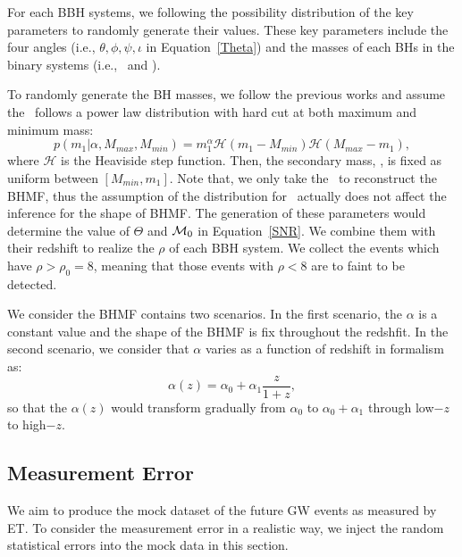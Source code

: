 \documentclass[twocolumn]{aastex62}
\begin{document}
For each BBH systems, we following the possibility distribution of the key parameters to randomly generate their values. These key parameters include the four angles (i.e., $\theta, \phi, \psi, \iota$ in Equation~\ref{Theta}) and the masses of each BHs in the binary systems (i.e., \mone\ and \mtwo).

To randomly generate the BH masses, we follow the previous works \citep{Kovetz2017PhRvD, Abbott2018b, Fishbach2018} and assume the \mone\ follows a power law distribution with hard cut at both maximum and minimum mass:
 \begin{equation} \label{equ_powlaw}
p(m_1|\alpha, M_{max}, M_{min}) = m_1^{\alpha} \mathcal{H}(m_1-M_{min}) \mathcal{H}(M_{max}-m_1),
 \end{equation}
where $\mathcal{H}$ is the Heaviside step function. Then, the secondary mass, \mtwo, is fixed as uniform between $[M_{min}, m_1]$. Note that, we only take the \mone\ to reconstruct the BHMF, thus the assumption of the distribution for \mtwo\ actually does not affect the inference for the shape of BHMF.
The generation of these parameters would determine the value of $\Theta$ and ${\cal M}_0$ in Equation~\ref{SNR}. We combine them with their redshift to realize the $\rho$ of each BBH system. We collect the events which have $\rho > \rho_0 = 8$, meaning that those events with $\rho < 8$ are to faint to be detected. 

We consider the BHMF contains two scenarios. In the first scenario, the $\alpha$ is a constant value and the shape of the BHMF is fix throughout the redshfit. In the second scenario, we consider that $\alpha$ varies as a function of redshift in formalism as:
 \begin{equation} \label{equ_alphaz}
\alpha(z) = \alpha_0 + \alpha_1\frac{z}{1+z} , 
 \end{equation}
so that the $\alpha(z)$ would transform gradually from $\alpha_0$ to $\alpha_0+\alpha_1$ through low$-z$ to high$-z$.

\subsection{Measurement Error} \label{sec_noiselevel}
We aim to produce the mock dataset of the future GW events as measured by ET. To consider the measurement error in a realistic way, we inject the random statistical errors into the mock data in this section.
\end{document}
